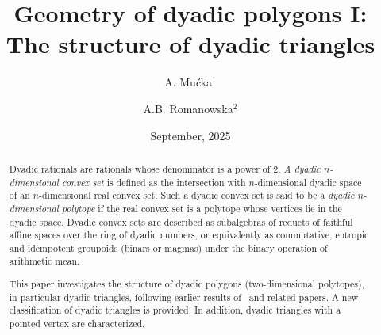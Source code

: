 \documentclass[12pt]{amsart}
\theoremstyle{plain}
\theoremstyle{definition}
\numberwithin{equation}{section}
\begin{document}
\textcolor[rgb]{0,0,1}{
}

\title[Geometry of dyadic polygons I] {Geometry of dyadic polygons I:\\ The structure of dyadic triangles}

\author[Mu\'{c}ka]{A. Mu\'{c}ka$^1$}
\address{$^1$ Faculty of Mathematics and Information Sciences\\
Warsaw University of Technology\\
00-661 Warsaw, Poland}

\author[Romanowska]{A.B. Romanowska$^2$}
\address{$^2$ Faculty of Mathematics and Information Sciences\\
Warsaw University of Technology\\
00-661 Warsaw, Poland}







\date{September, 2025}

\begin{abstract}


Dyadic rationals are rationals whose denominator is a power of $2$.  \emph{A dyadic
$n$-dimensional convex set} is defined as the intersection with $n$-dimensional dyadic
space of an $n$-dimensional real convex set.   Such a dyadic convex set is said to be
a \emph{dyadic $n$-dimensional polytope} if the real convex set is a polytope whose vertices
lie in the dyadic space.
Dyadic convex sets are described as subalgebras of reducts of faithful affine
spaces over the ring of dyadic numbers, or equivalently as commutative, entropic and
idempotent groupoids (binars or magmas) under the binary operation of arithmetic mean.


This paper investigates the structure of dyadic polygons (two-dimensional polytopes), in particular dyadic triangles, following earlier results of~\cite{MRS11} and related papers. A new classification of dyadic triangles is provided. In addition, dyadic triangles with a pointed vertex are characterized.

\end{abstract}

\maketitle
\end{document}
